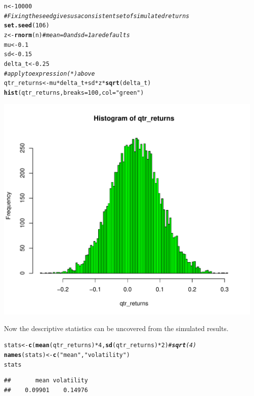 \documentclass[12pt, a4paper, oneside]{article}\usepackage[]{graphicx}\usepackage[]{color}
\makeatletter
\def\maxwidth{ %
  \ifdim\Gin@nat@width>\linewidth
    \linewidth
  \else
    \Gin@nat@width
  \fi
}
\newcommand{\hlstr}[1]{\textcolor[rgb]{0.192,0.494,0.8}{#1}}%
\newcommand{\hlcom}[1]{\textcolor[rgb]{0.678,0.584,0.686}{\textit{#1}}}%
\newcommand{\hlkwd}[1]{\textcolor[rgb]{0.737,0.353,0.396}{\textbf{#1}}}%
\newenvironment{kframe}{%
 \def\at@end@of@kframe{}%
 \ifinner\ifhmode%
  \def\at@end@of@kframe{\end{minipage}}%
  \begin{minipage}{\columnwidth}%
 \fi\fi%
 \def\FrameCommand##1{\hskip\@totalleftmargin \hskip-\fboxsep
 \colorbox{shadecolor}{##1}\hskip-\fboxsep
     \hskip-\linewidth \hskip-\@totalleftmargin \hskip\columnwidth}%
 \MakeFramed {\advance\hsize-\width
   \@totalleftmargin\z@ \linewidth\hsize
   \@setminipage}}%
 {\par\unskip\endMakeFramed%
 \at@end@of@kframe}
\newenvironment{knitrout}{}{} %
\makeatother
\begin{document}
\begin{knitrout}
\color{fgcolor}\begin{kframe}
\begin{alltt}
n <- 10000
\hlcom{# Fixing the seed gives us a consistent set of simulated returns}
\hlkwd{set.seed}(106)
z <- \hlkwd{rnorm}(n)  \hlcom{# mean = 0 and sd = 1 are defaults}
mu <- 0.1
sd <- 0.15
delta_t <- 0.25
\hlcom{# apply to expression (*) above}
qtr_returns <- mu * delta_t + sd * z * \hlkwd{sqrt}(delta_t)
\hlkwd{hist}(qtr_returns, breaks = 100, col = \hlstr{"green"})
\end{alltt}
\end{kframe}
\includegraphics[width=\maxwidth]{figure/MC} 

\end{knitrout}


Now the descriptive statistics can be uncovered from the simulated results. 
\begin{knitrout}
\color{fgcolor}\begin{kframe}
\begin{alltt}
stats <- \hlkwd{c}(\hlkwd{mean}(qtr_returns) * 4, \hlkwd{sd}(qtr_returns) * 2)  \hlcom{# \hlkwd{sqrt}(4)}
\hlkwd{names}(stats) <- \hlkwd{c}(\hlstr{"mean"}, \hlstr{"volatility"})
stats
\end{alltt}
\begin{verbatim}
##       mean volatility 
##    0.09901    0.14976
\end{verbatim}
\end{kframe}
\end{knitrout}
\end{document}
